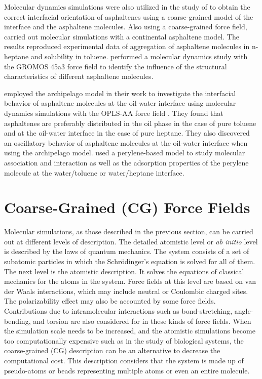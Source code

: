 Molecular dynamics simulations were also utilized in the study of   to obtain the correct interfacial orientation of asphaltenes using a coarse-grained model of the interface and the asphaltene molecules. Also using a coarse-grained force field,  carried out molecular simulations with a continental asphaltene model. The results reproduced experimental data of aggregation
of asphaltene molecules in n-heptane and solubility in toluene.  performed a molecular
dynamics study with the GROMOS 45a3 force field \cite{JCC:JCC1078} to identify the influence of the structural characteristics of different asphaltene molecules.

 employed the archipelago model in their work to investigate the interfacial behavior of asphaltene molecules at the oil-water interface using molecular dynamics simulations with the OPLS-AA force field \cite{doi:10.1021/ja00214a001}. They found that asphaltenes are preferably distributed in the oil phase in the case of pure toluene and at the oil-water interface
in the case of pure heptane. They also discovered an
oscillatory behavior of asphaltene molecules at the oil-water interface when using the archipelago model.  used a perylene-based model to study molecular association and interaction as well as the adsorption properties of the perylene molecule at the water/toluene or water/heptane interface. 

\section{Coarse-Grained (CG) Force Fields}\label{cgff}


Molecular simulations, as those described in the previous section, can be carried out at different levels of description. The detailed atomistic level or \textit{ab initio} level is described by the laws of quantum mechanics. The system consists of a set of subatomic particles in which the Schr\"{o}dinger's equation is solved for all of them. The next level is the atomistic description. It solves the equations of classical mechanics for the atoms in the system.  Force fields at this level are based on van der Waals interactions, which may include neutral or Coulombic charged sites. The polarizability effect may also be accounted by some force fields. Contributions due to intramolecular interactions such as bond-stretching, angle-bending, and torsion are also considered for in these kinds of force fields. When the simulation scale needs to be increased, and the atomistic simulations become too computationally expensive such as in the study of biological systems, the coarse-grained (CG) description can be an alternative to decrease the computational cost. This description considers that the system is made up of pseudo-atoms or beads representing multiple atoms or even an entire molecule. 

